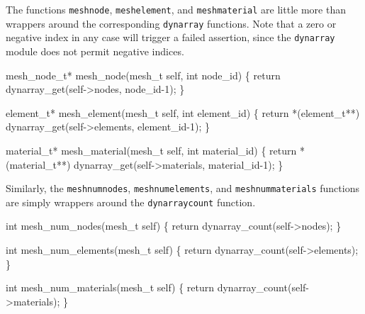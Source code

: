 \nwendcode{}\nwdocspar

The functions {\tt{}mesh{}node}, {\tt{}mesh{}element}, and {\tt{}mesh{}material}
are little more than wrappers around the corresponding {\tt{}dynarray}
functions.  Note that a zero or negative index in any case will trigger
a failed assertion, since the {\tt{}dynarray} module does not permit
negative indices.

\nwenddocs{}\plusendmoddef
mesh_node_t* mesh_node(mesh_t self, int node_id)
\{
    return dynarray_get(self->nodes, node_id-1);
\}

element_t* mesh_element(mesh_t self, int element_id)
\{
    return *(element_t**) dynarray_get(self->elements, element_id-1);
\}

material_t* mesh_material(mesh_t self, int material_id)
\{
    return *(material_t**) dynarray_get(self->materials, material_id-1);
\}

\nwendcode{}\nwdocspar

Similarly, the {\tt{}mesh{}num{}nodes}, {\tt{}mesh{}num{}elements}, and
{\tt{}mesh{}num{}materials} functions are simply wrappers around
the {\tt{}dynarray{}count} function.

\nwenddocs{}\plusendmoddef
int mesh_num_nodes(mesh_t self)
\{
    return dynarray_count(self->nodes);
\}

int mesh_num_elements(mesh_t self)
\{
    return dynarray_count(self->elements);
\}

int mesh_num_materials(mesh_t self)
\{
    return dynarray_count(self->materials);
\}

\nwendcode{}

